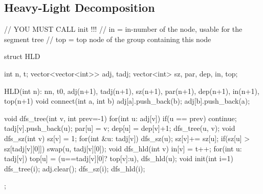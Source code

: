 \subsection{Heavy-Light Decomposition}
\begin{cpp}
// YOU MUST CALL init !!!
// in = in-number of the node, usable for the segment tree
// top = top node of the group containing this node

struct HLD{
  int n, t;
  vector<vector<int>> adj, tadj;
  vector<int> sz, par, dep, in, top;

  HLD(int n): n{n}, t{0}, adj(n+1), tadj(n+1),
    sz(n+1), par(n+1), dep(n+1), in(n+1), top(n+1) {}
  void connect(int a, int b)
    {adj[a].push_back(b); adj[b].push_back(a);}

  void dfs_tree(int v, int prev=-1){
    for(int u: adj[v]){
      if(u == prev) continue;
      tadj[v].push_back(u); par[u] = v; dep[u] = dep[v]+1;
      dfs_tree(u, v);
    }
  }
  void dfs_sz(int v){
    sz[v] = 1;
    for(int &u: tadj[v]){
      dfs_sz(u); sz[v]+= sz[u];
      if(sz[u] > sz[tadj[v][0]]) swap(u, tadj[v][0]);
    }
  }
  void dfs_hld(int v){
    in[v] = t++;
    for(int u: tadj[v])
      top[u] = (u==tadj[v][0]? top[v]:u), dfs_hld(u);
  }
  void init(int i=1){
    dfs_tree(i); adj.clear(); dfs_sz(i); dfs_hld(i);
  }
};
\end{cpp}